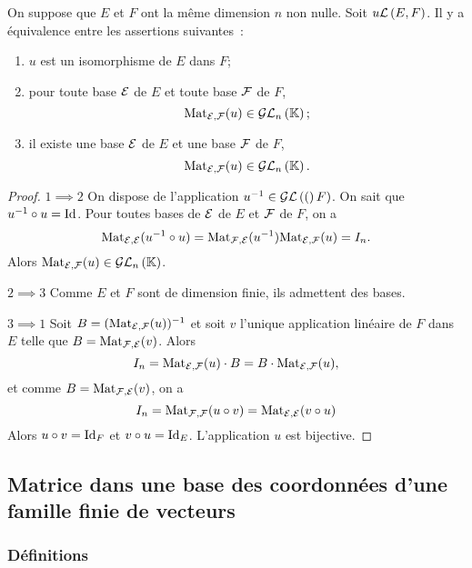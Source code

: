 \begin{theo}
  On suppose que $E$ et $F$ ont la même dimension $n$ non nulle. Soit $u \mathcal{L}\left(E,F\right)$. Il y a équivalence entre les assertions suivantes~:
  \begin{enumerate}
  \item $u$ est un isomorphisme de $E$ dans $F$;
  \item pour toute base $\mathcal{E}$ de $E$ et toute base $\mathcal{F}$ de $F$,
    \begin{equation}
      \mathrm{Mat}_{\mathcal{E},\mathcal{F}}(u) \in \mathcal{GL}_{n}\left(\mathbb{K}\right);
    \end{equation}
  \item il existe une base $\mathcal{E}$ de $E$ et une base $\mathcal{F}$ de $F$,
    \begin{equation}
      \mathrm{Mat}_{\mathcal{E},\mathcal{F}}(u) \in \mathcal{GL}_{n}\left(\mathbb{K}\right).
    \end{equation}
  \end{enumerate}
\end{theo}
\begin{proof}
  $1 \implies 2$ On dispose de l'application $u^{-1} \in \mathcal{GL}\left((\right)F)$. On sait que $u^{-1} \circ u = \operatorname{Id}$. Pour toutes bases de $\mathcal{E}$ de $E$ et $\mathcal{F}$ de $F$, on a
  \begin{equation}
    \mathrm{Mat}_{\mathcal{E},\mathcal{E}}(u^{-1} \circ u)=\mathrm{Mat}_{\mathcal{F},\mathcal{E}}(u^{-1}) \mathrm{Mat}_{\mathcal{E},\mathcal{F}}(u)=I_n.
  \end{equation}
  Alors $\mathrm{Mat}_{\mathcal{E},\mathcal{F}}(u) \in \mathcal{GL}_{n}\left(\mathbb{K}\right)$.

$2 \implies 3$ Comme $E$ et $F$ sont de dimension finie, ils admettent des bases.

$3 \implies 1$ Soit $B=(\mathrm{Mat}_{\mathcal{E},\mathcal{F}}(u))^{-1}$ et soit $v$ l'unique application linéaire de $F$ dans $E$ telle que $B=\mathrm{Mat}_{\mathcal{F},\mathcal{E}}(v)$. Alors
\begin{equation}
  I_n = \mathrm{Mat}_{\mathcal{E},\mathcal{F}}(u) \cdot B = B \cdot \mathrm{Mat}_{\mathcal{E},\mathcal{F}}(u),
\end{equation}
et comme $B=\mathrm{Mat}_{\mathcal{F},\mathcal{E}}(v)$, on a
\begin{equation}
  I_n = \mathrm{Mat}_{\mathcal{F},\mathcal{F}}(u \circ v) = \mathrm{Mat}_{\mathcal{E},\mathcal{E}}(v \circ u)
\end{equation}
Alors $u \circ v = \operatorname{Id}_F$ et $v \circ u = \operatorname{Id}_E$. L'application $u$ est bijective.
\end{proof}

\subsection{Matrice dans une base des coordonnées d'une famille finie de vecteurs}

\subsubsection{Définitions}

